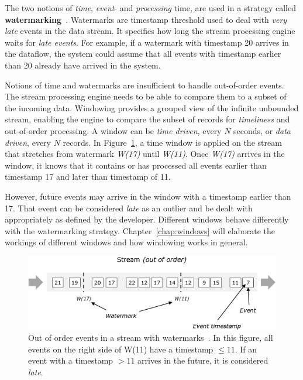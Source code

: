 The two notions of \emph{time}, \emph{event}- and \emph{processing} time,
are used in a strategy called \textbf{watermarking}~\cite{watermark_millwheel}. 
Watermarks are timestamp threshold used to deal with \emph{very late} events 
in the data stream. It specifies how long the stream processing engine 
waits for \emph{late events}. For example, if a watermark with timestamp 
20 arrives in the dataflow, the system could assume that all events 
with timestamp earlier than 20 already have arrived in the system. 

Notions of time and watermarks are insufficient to handle out-of-order 
events. The stream processing engine needs to be able to compare them to a subset of the 
incoming data. Windowing provides a grouped view of the infinite unbounded stream, 
enabling the engine to compare the subset of records for \emph{timeliness} and out-of-order 
processing. A window can be \emph{time driven}, every $N$ seconds, or \emph{data driven}, 
every $N$ records. 
In Figure~\ref{fig:watermark}, a time window is applied on the stream that
stretches from watermark \emph{W(17)} until \emph{W(11)}. 
Once \emph{W(17)} arrives in the window, it knows that it contains or has 
processed all events earlier than timestamp 17 and later than timestamp of 11.  

However, future events may arrive in the window 
with a timestamp earlier than 17. That event can be considered \emph{late} as an outlier and 
be dealt with appropriately as defined by the developer. Different windows 
behave differently with the watermarking strategy. Chapter~\ref{chap:windows}
will elaborate the workings of different windows and how windowing works in 
general. 


\begin{figure}[htpb]
    \centering
    \includegraphics[width=0.8\linewidth]{fig/stream_watermark_out_of_order.png}
    \caption[Out of order events in a stream with watermarks~\cite{watermark_flink}]
    {Out of order events in a stream with watermarks~\cite{watermark_flink}. In this figure, 
    all events on the right side of W(11) have a timestamp $\le 11$. If an event with 
    a timestamp $> 11$ arrives in the future, it is considered \emph{late}.}
    \label{fig:watermark}
\end{figure}


